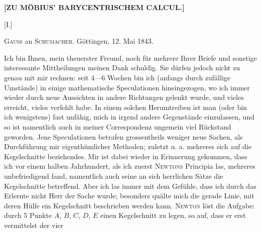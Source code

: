 \clearpage{}
\begin{center}
\textbf{[ZU MÖBIUS' BARYCENTRISCHEM CALCUL.]}

\medskip

[I.]
\end{center}

\begin{center}\textsc{Gauss} an \textsc{Schumacher}. Göttingen, 12. Mai 1843.\end{center}

Ich bin Ihnen, mein theuerster Freund, noch für mehrere Ihrer Briefe und sonstige
interessante Mittheilungen meinen Dank schuldig. Sie dürfen jedoch nicht zu genau mit
mir rechnen: seit 4---6 Wochen bin ich (anfangs durch zufällige Umstände) in einige
mathematische Speculationen hineingezogen, wo ich immer wieder durch neue Aussichten in
andere Richtungen gelenkt wurde, und vieles erreicht, vieles verfehlt habe. In einem
solchen Herumtreiben ist man (oder bin ich wenigstens) fast unfähig, mich in irgend
andere Gegenstände einzulassen, und so ist namentlich auch in meiner Correspondenz ungemein viel Rückstand geworden.
Jene Speculationen betrafen grossentheils weniger neue Sachen, als Durchführung mir
eigenthümlicher Methoden; zuletzt u. a. mehreres sich auf die Kegelschnitte
beziehendes. Mir ist dabei wieder in Erinnerung gekommen, dass ich vor einem halben
Jahrhundert, als ich zuerst \textsc{Newtons} Principia las, mehreres unbefriedigend
fand, namentlich auch seine an sich herrlichen Sätze die Kegelschnitte betreffend.
Aber ich las immer mit dem Gefühle, dass ich durch das Erlernte nicht Herr der Sache
wurde; besonders quälte mich die gerade Linie, mit deren Hülfe ein Kegelschnitt
beschrieben werden kann. \textsc{Newton} löst die Aufgabe: durch 5 Punkte $A$, $B$,
$C$, $D$, $E$ einen Kegelschnitt zu legen, so auf, dass er erst vermittelst der vier
